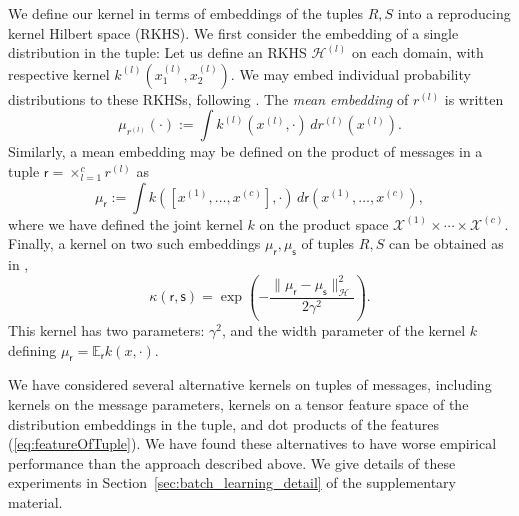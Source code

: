 \documentclass[english]{article}
\theoremstyle{plain}
\theoremstyle{plain}
\newcommand{\secref}[1]{Section~\ref{#1}}
\begin{document}


We define our kernel in terms of embeddings of the tuples $R,S$ into a reproducing kernel Hilbert space (RKHS). We first consider the embedding of a single distribution
in the tuple: Let us define an RKHS
$\mathcal{H}^{(l)}$ on each domain, with respective kernel $k^{(l)}(x^{(l)}_1,x^{(l)}_2)$.
We may embed individual probability distributions to these RKHSs, following \citep{Smola2007}.
The {\em mean embedding} of $r^{(l)}$ is written
\begin{equation}
\mu_{r^{(l)}}(\cdot) := \int k^{(l)}(x^{(l)},\cdot) \, dr^{(l)} (x^{(l)}).
\end{equation}
%
Similarly, a mean embedding may be defined on the product of  messages in a tuple
$\mathsf{r}=\times_{l=1}^{c}r^{(l)}$ as
%
\begin{equation}
\mu_{\mathsf{r}}
:=
\int k([x^{(1)}, \ldots, x^{(c)}],\cdot) \, d\mathsf{r}(x^{(1)}, \ldots, x^{(c)}),
\label{eq:featureOfTuple}
\end{equation}
where we have defined the joint kernel $k$ on the product space
$\mathcal{X}^{(1)}\times\cdots\times\mathcal{X}^{(c)}$.
Finally,  a kernel on two such embeddings $\mu_{\mathsf{r}},\mu_{\mathsf{s}}$ of tuples $R,S$ can be obtained as in \citet[eq. 9]{Christmann2010},
%
\begin{equation}
\kappa(\mathsf{r}, \mathsf{s}) = \exp\left(-\frac{\|\mu_{\mathsf{r}}-\mu_{\mathsf{s}}\|_{\mathcal{H}}^{2}}{2\gamma^{2}}\right).
\label{eq:gauss_joint_emb}
\end{equation}
%
This kernel has two parameters: $\gamma^{2}$, and the width parameter of the kernel $k$ defining $\mu_{\mathsf{r}} = \mathbb{E}_{\mathsf{r}}k(x,\cdot)$.

We have considered several alternative kernels on tuples of messages, including
kernels on the message parameters, kernels on a tensor feature space of the
distribution embeddings in the tuple, and dot products of the features
(\ref{eq:featureOfTuple}). We have found these alternatives to have worse
empirical performance than the approach described above. We give details of
these experiments in \secref{sec:batch_learning_detail} of the
supplementary material.
\end{document}
